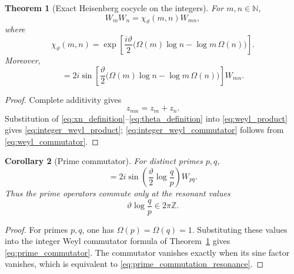 \documentclass[11pt]{amsart}
\numberwithin{equation}{section}
\theoremstyle{plain}
\newtheorem{theorem}{Theorem}[section]
\newtheorem{corollary}[theorem]{Corollary}
\theoremstyle{definition}
\theoremstyle{remark}
\newcommand{\N}{\mathbb{N}}
\newcommand{\Om}{\Omega}
\begin{document}
\begin{theorem}[Exact Heisenberg cocycle on the integers]
\label{thm:integer_weyl_cocycle}
For $m,n\in\N$,
\begin{equation}
W_mW_n
=
\chi_{\vartheta}(m,n)W_{mn},
\label{eq:integer_weyl_product}
\end{equation}
where
\begin{equation}
\chi_{\vartheta}(m,n)
=
\exp\!\left[
\frac{i\vartheta}{2}
\bigl(\Om(m)\log n-\log m\,\Om(n)\bigr)
\right].
\label{eq:chi_definition}
\end{equation}
Moreover,
\begin{equation}
[W_m,W_n]
=
2i\sin\!\left[
\frac{\vartheta}{2}
\bigl(\Om(m)\log n-\log m\,\Om(n)\bigr)
\right]W_{mn}.
\label{eq:integer_weyl_commutator}
\end{equation}
\end{theorem}

\begin{proof}
Complete additivity gives
\begin{equation}
z_{mn}=z_m+z_n.
\label{eq:phase_space_additivity}
\end{equation}
Substitution of \eqref{eq:xn_definition}--\eqref{eq:theta_definition} into
\eqref{eq:weyl_product} gives \eqref{eq:integer_weyl_product};
\eqref{eq:integer_weyl_commutator} follows from
\eqref{eq:weyl_commutator}.
\end{proof}

\begin{corollary}[Prime commutator]
\label{cor:prime_commutator}
For distinct primes $p,q$,
\begin{equation}
[W_p,W_q]
=
2i\sin\!\left(\frac{\vartheta}{2}\log\frac{q}{p}\right)W_{pq}.
\label{eq:prime_commutator}
\end{equation}
Thus the prime operators commute only at the resonant values
\begin{equation}
\vartheta\log\frac{q}{p}\in2\pi\mathbb Z.
\label{eq:prime_commutation_resonance}
\end{equation}
\end{corollary}

\begin{proof}
For primes \(p,q\), one has \(\Omega(p)=\Omega(q)=1\).  Substituting these
values into the integer Weyl commutator formula of
Theorem~\ref{thm:integer_weyl_cocycle} gives
\eqref{eq:prime_commutator}.  The commutator vanishes exactly when its sine
factor vanishes, which is equivalent to
\eqref{eq:prime_commutation_resonance}.
\end{proof}
\end{document}
